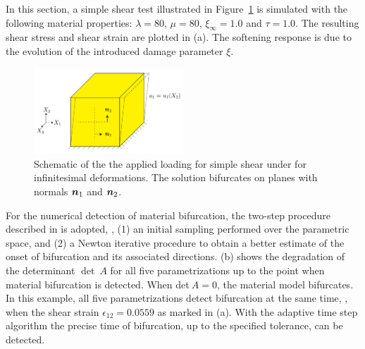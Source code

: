 \documentclass[12pt]{article}
\numberwithin{equation}{section}
\begin{document}
In this section, a simple shear test illustrated in Figure~\ref{fig:simple_shear} is simulated with the following
material properties: $\lambda = 80$, $\mu = 80$, $\xi_{\infty} = 1.0$
and $\tau = 1.0$. The resulting shear stress and shear strain are
plotted in (a). The softening response is
due to the evolution of the introduced damage parameter $\xi$.
\begin{figure}[!htbp]
 \centering
      \includegraphics[width=0.5\textwidth]{figs/simple_shear_schematic.pdf}
     \caption{Schematic of the the applied loading for simple shear under for infinitesimal deformations. The solution bifurcates on planes with normals ${\boldsymbol{n}}_{1}$ and ${\boldsymbol{n}}_{2}$.}
      \label{fig:simple_shear}
\end{figure}
For the numerical detection of material bifurcation, the two-step
procedure described in  is adopted, \ie, (1) an
initial sampling performed over the parametric space, and (2) a Newton
iterative procedure to obtain a better estimate of the onset of
bifurcation and its associated directions.
(b) shows the degradation of the
determinant $\det~A$ for all five parametrizations up to the point
when material bifurcation is detected. When det$~A = 0$, the material
model bifurcates. In this example, all five parametrizations detect
bifurcation at the same time, \ie, when the shear strain
$\epsilon_{12}=0.0559$ as marked in 
(a). With the adaptive time step algorithm the precise time of
bifurcation, up to the specified tolerance, can be detected.
\end{document}
